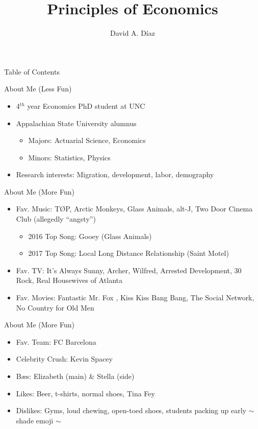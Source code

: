 \documentclass[xcolor={dvipsnames},pdf, hyperref={colorlinks=true, citecolor=ForestGreen, linkcolor=BlueViolet, urlcolor=Magenta}]{beamer}
\title{Principles of Economics}
\author{David A. D\'iaz}
\institute{UNC Chapel Hill}
\date{}
\begin{document}
 
	
	\begin{frame}
		
		\titlepage
		
	\end{frame}
	
\begin{frame}{Table of Contents}
	
	\tableofcontents
\end{frame}


\begin{frame}{About Me (Less Fun)}
	\begin{itemize}
		\item 4$^{th}$ year Economics PhD student at UNC
		\item Appalachian State University alumnus
		\begin{itemize}
			\item Majors: Actuarial Science, Economics
			\item Minors: Statistics, Physics
		\end{itemize}
		\item Research interests: Migration, development, labor, demography
	\end{itemize}
\end{frame}


\begin{frame}{About Me (More Fun)}
	\begin{itemize}
		\item Fav. Music: T\O P, Arctic Monkeys, Glass Animals, alt-J, Two Door Cinema Club (allegedly ``angsty'')
		\begin{itemize}
			\item 2016 Top Song: Gooey (Glass Animals)
			\item 2017 Top Song: Local Long Distance Relationship (Saint Motel)
		\end{itemize}
		\item Fav. TV: It's Always Sunny, Archer, Wilfred, Arrested Development, 30 Rock, Real Housewives of Atlanta
		\item Fav. Movies: Fantastic Mr. Fox , Kiss Kiss Bang Bang, The Social Network, No Country for Old Men
	\end{itemize}
\end{frame}

\begin{frame}{About Me (More Fun)}
	\begin{itemize}
		\item Fav. Team: FC Barcelona
		\item Celebrity Crush: Kevin Spacey
		\item B\ae s: Elizabeth (main) \& Stella (side)
		\item Likes: Beer, t-shirts, normal shoes, Tina Fey
		\item Dislikes: Gyms, loud chewing, open-toed shoes, students packing up early $\sim$ shade emoji $\sim$
	\end{itemize}
\end{frame}
\end{document}
